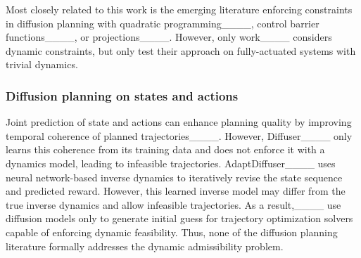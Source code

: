 Most closely related to this work is the emerging literature enforcing constraints in diffusion planning with quadratic programming____, control barrier functions____, or projections____. However, only work____ considers dynamic constraints, but only test their approach on fully-actuated systems with trivial dynamics.


\subsubsection{Diffusion planning on states and actions}

Joint prediction of state and actions can enhance planning quality by improving temporal coherence of planned trajectories____. However, Diffuser____ only learns this coherence from its training data and does not enforce it with a dynamics model, leading to infeasible trajectories. AdaptDiffuser____ uses neural network-based inverse dynamics to iteratively revise the state sequence and predicted reward. However, this learned inverse model may differ from the true inverse dynamics and allow infeasible trajectories. As a result,____ use diffusion models only to generate initial guess for trajectory optimization solvers capable of enforcing dynamic feasibility. Thus, none of the diffusion planning literature formally addresses the dynamic admissibility problem.










